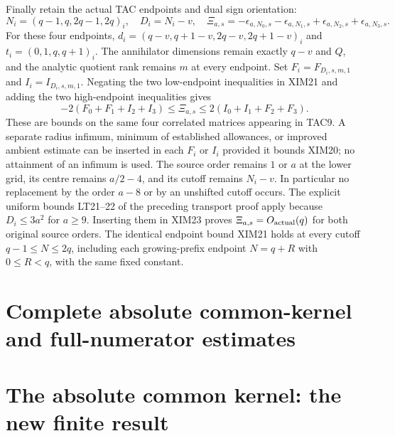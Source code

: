 \documentclass[11pt,a4paper]{article}
\begin{document}
Finally retain the actual TAC endpoints and dual sign orientation:
\[
 N_i=(q-1,q,2q-1,2q)_i,\quad D_i=N_i-v,\quad
 \Xi_{a,s}=-\epsilon_{a,N_0,s}-\epsilon_{a,N_1,s}
             +\epsilon_{a,N_2,s}+\epsilon_{a,N_3,s}.
 \tag{XIM22}
\]
For these four endpoints,
$d_i=(q-v,q+1-v,2q-v,2q+1-v)_i$ and
$t_i=(0,1,q,q+1)_i$. The annihilator dimensions remain exactly
$q-v$ and $Q$, and the analytic quotient rank remains $m$ at every
endpoint. Set $F_i=F_{D_i,s,m,1}$ and $I_i=I_{D_i,s,m,1}$.
Negating the two low-endpoint inequalities in XIM21 and adding the
two high-endpoint inequalities gives
\[
 \boxed{
 -2(F_0+F_1+I_2+I_3)
       \le\Xi_{a,s}\le
  2(I_0+I_1+F_2+F_3).}
 \tag{XIM23}
\]
These are bounds on the same four correlated matrices appearing in
TAC9. A separate radius infimum, minimum of established allowances,
or improved ambient estimate can be inserted in each $F_i$ or $I_i$
provided it bounds XIM20; no attainment of an infimum is used.
The source order remains $1$ or $a$ at the lower grid, its centre
remains $a/2-4$, and its cutoff remains $N_i-v$. In particular no
replacement by the order $a-8$ or by an unshifted cutoff occurs.
The explicit uniform bounds LT21--22 of the preceding transport proof
apply because $D_i\le3a^2$ for $a\ge9$. Inserting them in XIM23
proves $\Xi_{a,s}=O_{\rm actual}(q)$ for both original source orders.
The identical endpoint bound XIM21 holds at every cutoff
$q-1\le N\le2q$, including each growing-prefix endpoint $N=q+R$
with $0\le R<q$, with the same fixed constant.
\endgroup

\endgroup

\clearpage
\begingroup


\setcounter{equation}{0}
\renewcommand{\theequation}{AKS.\arabic{equation}}
\section*{Complete absolute common-kernel and full-numerator estimates}
\section{The absolute common kernel: the new finite result}
\label{aks:sec:AKS}
\end{document}
